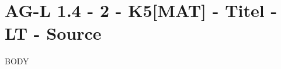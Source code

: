 \section{AG-L 1.4 - 2 - K5[MAT] - Titel - LT - Source}

\begin{beispiel}[AG-L 1.4]{1}
BODY
\end{beispiel}